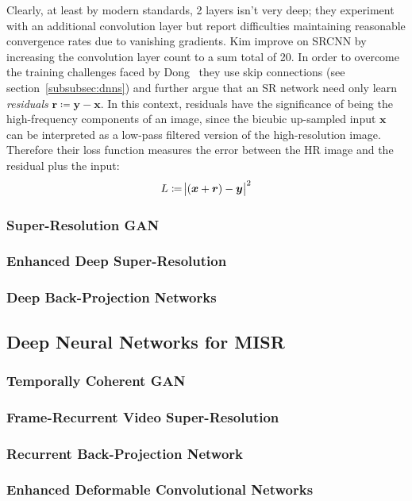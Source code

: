 Clearly, at least by modern standards, 2 layers isn't very deep; they experiment with an additional convolution layer but report difficulties maintaining reasonable convergence rates due to vanishing gradients.
%
Kim \etal\cite{Kim_2016} improve on SRCNN by increasing the convolution layer count to a sum total of 20.
%
In order to overcome the training challenges faced by Dong \etal~they use skip connections (see section~\ref{subsubsec:dnns}) and further argue that an SR network need only learn \textit{residuals} \(\bm{r} \coloneqq \bm{y} - \bm{x}\).
%
In this context, residuals have the significance of being the high-frequency components of an image, since the bicubic up-sampled input \(\bm{x}\) can be interpreted as a low-pass filtered version of the high-resolution image.
%
Therefore their loss function measures the error between the HR image and the residual plus the input:
\begin{equation}
    L \coloneqq \abs{(\bm{x} + \bm{r}) - \bm{y}}^2
\end{equation}
\subsubsection{Super-Resolution GAN}\label{subsubsec:srgan}
\subsubsection{Enhanced Deep Super-Resolution}\label{subsubsec:EDSR}
\subsubsection{Deep Back-Projection Networks}\label{subsubsec:dbpn}
\subsection{Deep Neural Networks for MISR}
\subsubsection{Temporally Coherent GAN}\label{subsubsec:tecogan}
\subsubsection{Frame-Recurrent Video Super-Resolution}\label{subsubsec:frvsr}
\subsubsection{Recurrent Back-Projection Network}\label{subsubsec:rbpn}
\subsubsection{Enhanced Deformable Convolutional Networks}\label{subsubsec:edvr}
